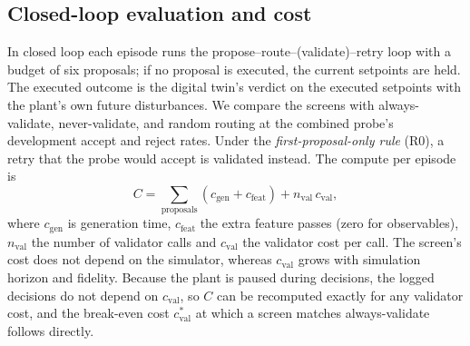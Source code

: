 \subsection{Closed-loop evaluation and cost}
In closed loop each episode runs the propose--route--(validate)--retry loop with a budget of six proposals; if no
proposal is executed, the current setpoints are held. The executed outcome is the digital twin's verdict on the
executed setpoints with the plant's own future disturbances. We compare the screens with always-validate,
never-validate, and random routing at the combined probe's development accept and reject rates. Under the
\emph{first-proposal-only rule} (R0), a retry that the probe would accept is validated instead. The compute per
episode is
\begin{equation}
C = \sum_{\text{proposals}} \left(c_{\mathrm{gen}} + c_{\mathrm{feat}}\right) + n_{\mathrm{val}}\,c_{\mathrm{val}},
\end{equation}
where $c_{\mathrm{gen}}$ is generation time, $c_{\mathrm{feat}}$ the extra feature passes (zero for observables),
$n_{\mathrm{val}}$ the number of validator calls and $c_{\mathrm{val}}$ the validator cost per call. The screen's cost
does not depend on the simulator, whereas $c_{\mathrm{val}}$ grows with simulation horizon and fidelity. Because the
plant is paused during decisions, the logged decisions do not depend on $c_{\mathrm{val}}$, so $C$ can be recomputed
exactly for any validator cost, and the break-even cost $c^{*}_{\mathrm{val}}$ at which a screen matches
always-validate follows directly.
